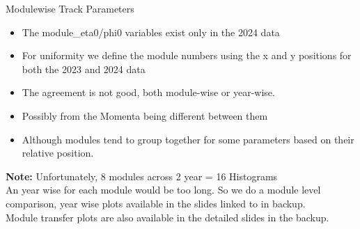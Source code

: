 \begin{frame}{Modulewise Track Parameters}
    
    \begin{itemize}
        \item The module\_eta0/phi0 variables exist only in the 2024 data
        \item For uniformity we define the module numbers using the x and y positions for both the 2023 and 2024 data
        \item The agreement is not good, both module-wise or year-wise.
        \item Possibly from the Momenta being different between them
        \item Although modules tend to group together for some parameters based on their relative position.
    \end{itemize}
    \vspace{0.3 cm}
    \small{    
    \textbf{Note:} Unfortunately, 8 modules across 2 year = 16 Histograms \\
    An year wise for each module would be too long.
    So we do a module level comparison, year wise plots available in the slides linked to in backup.\\ 
    
    Module transfer plots are also available in the detailed slides in the backup.  
    }
\end{frame}




